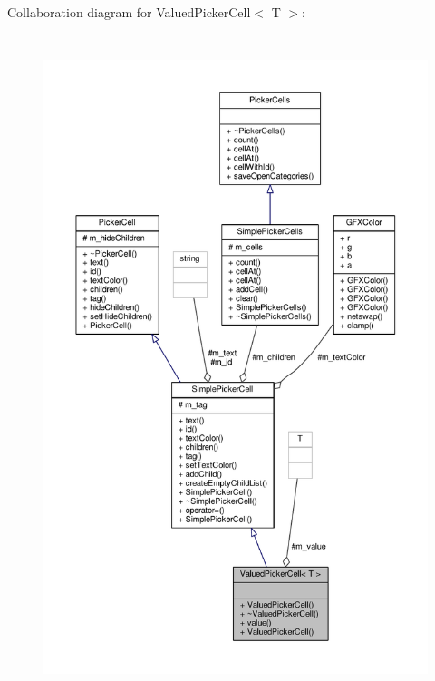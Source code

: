 Collaboration diagram for Valued\+Picker\+Cell$<$ T $>$\+:
\nopagebreak
\begin{figure}[H]
\begin{center}
\leavevmode
\includegraphics[height=550pt]{d4/d9c/classValuedPickerCell__coll__graph}
\end{center}
\end{figure}

